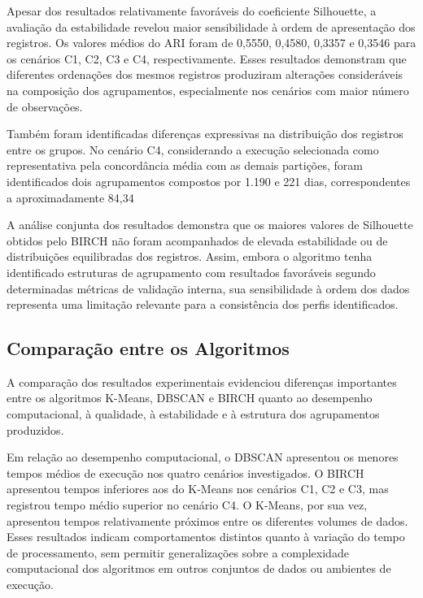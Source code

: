 \documentclass[lettersize,journal]{IEEEtran}
\begin{document}
Apesar dos resultados relativamente favoráveis do coeficiente Silhouette, a avaliação da estabilidade revelou maior sensibilidade à ordem de apresentação dos registros. Os valores médios do ARI foram de 0,5550, 0,4580, 0,3357 e 0,3546 para os cenários C1, C2, C3 e C4, respectivamente. Esses resultados demonstram que diferentes ordenações dos mesmos registros produziram alterações consideráveis na composição dos agrupamentos, especialmente nos cenários com maior número de observações.

Também foram identificadas diferenças expressivas na distribuição dos registros entre os grupos. No cenário C4, considerando a execução selecionada como representativa pela concordância média com as demais partições, foram identificados dois agrupamentos compostos por 1.190 e 221 dias, correspondentes a aproximadamente 84,34%

A análise conjunta dos resultados demonstra que os maiores valores de Silhouette obtidos pelo BIRCH não foram acompanhados de elevada estabilidade ou de distribuições equilibradas dos registros. Assim, embora o algoritmo tenha identificado estruturas de agrupamento com resultados favoráveis segundo determinadas métricas de validação interna, sua sensibilidade à ordem dos dados representa uma limitação relevante para a consistência dos perfis identificados.

\subsection{Comparação entre os Algoritmos}
A comparação dos resultados experimentais evidenciou diferenças importantes entre os algoritmos K-Means, DBSCAN e BIRCH quanto ao desempenho computacional, à qualidade, à estabilidade e à estrutura dos agrupamentos produzidos.

Em relação ao desempenho computacional, o DBSCAN apresentou os menores tempos médios de execução nos quatro cenários investigados. O BIRCH apresentou tempos inferiores aos do K-Means nos cenários C1, C2 e C3, mas registrou tempo médio superior no cenário C4. O K-Means, por sua vez, apresentou tempos relativamente próximos entre os diferentes volumes de dados. Esses resultados indicam comportamentos distintos quanto à variação do tempo de processamento, sem permitir generalizações sobre a complexidade computacional dos algoritmos em outros conjuntos de dados ou ambientes de execução.
\end{document}
